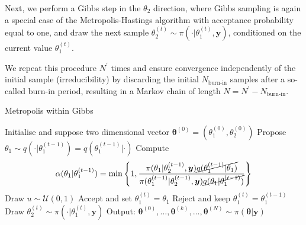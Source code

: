 Next, we perform a Gibbs step in the $\theta_2$ direction, where Gibbs sampling is again a special case of the Metropolis-Hastings algorithm with acceptance probability equal to one, and draw the next sample $\theta_2^{(t)} \sim \pi(\cdot |  \theta_1^{(t)}, \bm{y})$, conditioned on the current value $\theta_1^{(t)}$. 

We repeat this procedure $N^{\prime}$ times and ensure convergence independently of the initial sample (irreducibility) by discarding the initial $N_{\text{burn-in}}$ samples after a so-called burn-in period, resulting in a Markov chain of length $N = N^{\prime} - N_{\text{burn-in}}$.

\begin{algorithm}[!ht]
	\caption{Metropolis within Gibbs}
	\begin{algorithmic}[1]
		\STATE Initialise and suppose two dimensional vector \( \bm{\theta}^{(0)}  =( \theta_1^{(0)} , \theta_2^{(0)}  ) \)
		\STATE Propose \( \theta_1 \sim q(\cdot   | \theta_1 ^{(t-1)}) = q(\theta_1 ^{(t-1)} |\cdot  ) \)
		\STATE Compute
		\[ \alpha( \theta_1  | \theta_1^{(t-1)}) = \min \left\{ 1, \frac{\pi(\theta_1  | \theta^{(t-1)}_2, \bm{y}) \cancel{q(\theta_1^{(t-1)} | \theta_1 ) } }{\pi(\theta_1^{(t-1)}| \theta_2^{(t-1)}, \bm{y}) \cancel{q(\theta_1 | \theta_1^{(t-1)})} } \right\} \]
		\STATE Draw $u \sim \mathcal{U}(0,1)$
		\STATE Accept and set \( \theta_1^{(t)} = \theta_1 \)
		\ELSE  
		\STATE Reject and keep \(\theta_1^{(t)} = \theta_1^{(t-1)} \)
		\ENDIF
		\STATE Draw \(\theta_2^{(t)} \sim  \pi( \cdot | \theta_1^{(t)} , \bm{y} )\) 
		\ENDFOR
		\STATE Output: $ \bm{\theta}^{(0)}, \dots,  \bm{\theta}^{(k)} , \dots,   \bm{\theta}^{(N)} \sim \pi(\bm{\theta}| \bm{y}) $
	\end{algorithmic}
	\label{alg:MwG}
\end{algorithm}


